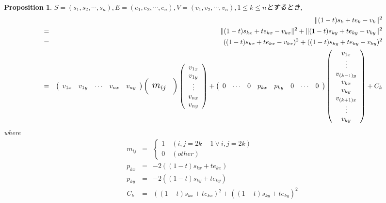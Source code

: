 \documentclass[8pt]{article}
\newtheorem{prop}{\bf Proposition}
\begin{document}
\begin{prop}\label{prop:sim}
$S = (s_1,s_2,\cdots ,s_n),E = (e_1,e_2, \cdots ,e_n),V = (v_1,v_2,\cdots,v_n), 1 \leq k \leq n$とするとき,\\
\begin{eqnarray*}
&&\|(1-t)s_k + t e_k - v_k\|^2 \\
&=& \|(1-t)s_{kx} + t e_{kx} - v_{kx}\|^2 + \|(1-t)s_{ky} + t e_{ky} - v_{ky}\|^2\\
&=&((1-t)s_{kx} + t e_{kx} - v_{kx})^2 + ((1-t)s_{ky} + t e_{ky} - v_{ky})^2\\
&=& 
\left(
     \begin{array}{ccccc}
      v_{1x} & v_{1y} & \cdots & v_{nx}  &v_{ny}
     \end{array}
  \right)
\left(
     \begin{array}{cc}
 	\multicolumn{2}{c}{\multirow{2}{*}{\mbox {\smash{\Large $m_{ij}$ }}}} \\
    	\multicolumn{2}{c}{}\\
     \end{array}
  \right)
 \left(
     \begin{array}{c}
 	v_{1x}\\
	v_{1y}\\
	\vdots \\
	v_{nx}\\
	v_{ny}   
     \end{array}
  \right)+
\left(
     \begin{array}{cccccccc}
      0 & \cdots & 0 & p_{kx}  & p_{ky} & 0 & \cdots &0\\ 
     \end{array}
  \right)
 \left(
     \begin{array}{c}
 	v_{1x}\\
	\vdots \\
	v_{(k-1)y}\\
	v_{kx}\\
	v_{ky}\\
	v_{(k+1)x}\\
	\vdots\\
	v_{ky}   
     \end{array}
  \right) + C_k
\end{eqnarray*}
where\\
\begin{eqnarray*}
m_{ij} &=&
\begin{cases}
1\quad(i,j=2k-1 \lor i,j = 2k)\\
0\quad(other)
\end{cases}\\
p_{kx} &=& -2((1-t)s_{kx} + t e_{kx})\\
p_{ky} &=& -2((1-t)s_{ky} + t e_{ky})\\
C_k &=& ((1-t)s_{kx}+t e_{kx})^2 + ((1-t)s_{ky} + t e_{ky})^2
\end{eqnarray*}
\end{prop}
\end{document}
